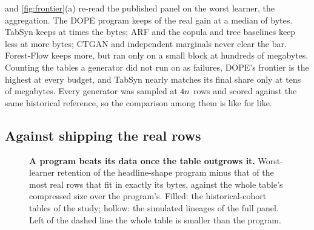 \documentclass{article}
\theoremstyle{remark}
\newlength{\pairedwidth}
\begin{document}
\begin{table}[t]
\caption{\textbf{Generators on the historical validation panel, worst of three learners, synthetic size
$\cSynthetic$.} Median charged bytes and median worst-learner retention over tables; the third column
counts tables whose worst learner keeps at least $\cTau$ of the real gain. TVAE and CTGAN ran on a smaller
cohort and Forest-Flow on a historical block. Selection-exposed validation.}
\label{tab:generators}
\centering
\small
{}
\end{table}

 and \cref{fig:frontier}(a) re-read the published panel on the worst learner, the
\MetricName{} aggregation. The DOPE program keeps \EbPublishedRobust{} of the real gain at a median of
\EbPublishedBytes{} bytes. TabSyn keeps \EbTabSynRobust{} at \EbTabSynFactor{} times the bytes; ARF and
the copula and tree baselines keep less at more bytes; CTGAN and independent marginals never clear the
bar. Forest-Flow keeps more, but ran only on a small block at hundreds of megabytes. Counting the tables a
generator did not run on as failures, DOPE's frontier is the highest at every budget, and TabSyn nearly
matches its final share only at tens of megabytes. Every generator was sampled at $\cSynthetic$ rows and
scored against the same historical reference, so the comparison among them is like for like.

\subsection{Against shipping the real rows}

\begin{figure}[t]
  \centering
  \caption{\textbf{A program beats its data once the table outgrows it.} Worst-learner retention of the
  headline-shape program minus that of the most real rows that fit in exactly its bytes, against the whole
  table's compressed size over the program's. Filled: the historical-cohort tables of the study; hollow: the
  simulated lineages of the full panel. Left of the dashed line the whole table is smaller than the
  program.}
  \label{fig:paired}
\end{figure}
\end{document}
